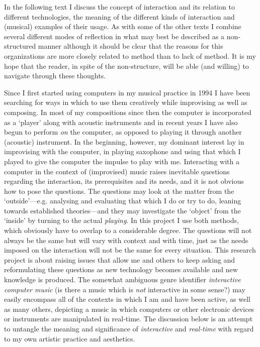 In the following text I discuss the concept of interaction and its relation to different technologies, the meaning of the different kinds of interaction and (musical) examples of their usage. As with some of the other texts I combine several different modes of reflection in what may best be described as a non-structured manner although it should be clear that the reasons for this organizations are more closely related to method than to lack of method. It is my hope that the reader, in spite of the non-structure, will be able (and willing) to navigate through these thoughts.

Since I first started using computers in my musical practice in 1994 I have been searching for ways in which to use them creatively while improvising as well as composing. In most of my compositions since then the computer is incorporated as a `player' along with acoustic instruments and in recent years I have also begun to perform \emph{on} the computer, as opposed to playing it through another (acoustic) instrument. In the beginning, however, my dominant interest lay in improvising with the computer, in playing saxophone and using that which I played to give the computer the impulse to play with me. Interacting with a computer in the context of (improvised) music raises inevitable questions regarding the interaction, its prerequisites and its needs, and it is not obvious how to pose the questions. The questions may look at the matter from the `outside'---e.g. analysing and evaluating that which I do or try to do, leaning towards established theories---and they may investigate the `object' from the `inside' by turning to the actual \emph{playing}. In this project I use both methods, which obviously have to overlap to a considerable degree. The questions will not always be the same but will vary with context and with time, just as the needs imposed on the interaction will not be the same for every situation. This research project is about raising issues that allow me and others to keep asking and reformulating these questions as new technology becomes available and new knowledge is produced. The somewhat ambiguous genre identifier \emph{interactive computer music} (is there a music which is \emph{not} interactive in some sense?) may easily encompass all of the contexts in which I am and have been active, as well as many others, depicting a music in which computers or other electronic devices or instruments are manipulated in real-time. The discussion below is an attempt to untangle the meaning and significance of \emph{interactive} and \emph{real-time} with regard to my own artistic practice and aesthetics.

